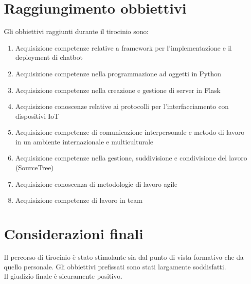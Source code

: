 \documentclass[a4paper,11pt]{article}
\theoremstyle{plain}
\begin{document}
\section*{Raggiungimento obbiettivi}
Gli obbiettivi raggiunti durante il tirocinio sono:
\begin{enumerate}
\item Acquisizione competenze relative a framework per l'implementazione e il deployment di chatbot 
\item Acquisizione competenze nella programmazione ad oggetti in Python
\item Acquisizione competenze nella creazione e gestione di server in Flask
\item Acquisizione conoscenze relative ai protocolli per l'interfacciamento con dispositivi IoT 
\item Acquisizione competenze di comunicazione interpersonale e metodo di lavoro in un ambiente internazionale e multiculturale 
\item Acquisizione competenze nella gestione, suddivisione e condivisione del lavoro (SourceTree)
\item Acquisizione conoscenza di metodologie di lavoro agile 
\item Acquisizione competenze di lavoro in team 
\end{enumerate}
\section*{Considerazioni finali}
Il percorso di tirocinio è stato stimolante sia dal punto di vista formativo che da quello personale.
Gli obbiettivi prefissati sono stati largamente soddisfatti.\\
Il giudizio finale è sicuramente positivo.
\end{document}
